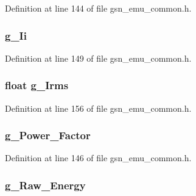 Definition at line 144 of file gsn\_\-emu\_\-common.h.

\hypertarget{a00066_a994b5cc351ab168c7fc6a0bb547770fa}{
\subsubsection[{g\_\-Ii}]{ {\bf g\_\-Ii}}}
\label{a00066_a994b5cc351ab168c7fc6a0bb547770fa}


Definition at line 149 of file gsn\_\-emu\_\-common.h.

\hypertarget{a00066_a72422c55ed61af626d537b7c409f2a81}{
\subsubsection[{g\_\-Irms}]{\setlength{\rightskip}{0pt plus 5cm}float {\bf g\_\-Irms}}}
\label{a00066_a72422c55ed61af626d537b7c409f2a81}


Definition at line 156 of file gsn\_\-emu\_\-common.h.

\hypertarget{a00066_a7f69a16edf8ccbde51d8d40f1f9b326d}{
\subsubsection[{g\_\-Power\_\-Factor}]{ {\bf g\_\-Power\_\-Factor}}}
\label{a00066_a7f69a16edf8ccbde51d8d40f1f9b326d}


Definition at line 146 of file gsn\_\-emu\_\-common.h.

\hypertarget{a00066_a0798625f2c1b6aecf2fb63cf03949f2d}{
\subsubsection[{g\_\-Raw\_\-Energy}]{ {\bf g\_\-Raw\_\-Energy}}}
\label{a00066_a0798625f2c1b6aecf2fb63cf03949f2d}


